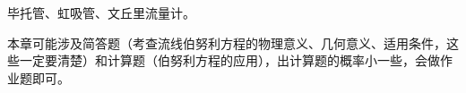 
毕托管、虹吸管、文丘里流量计。

\begin{tip}
	本章可能涉及简答题（考查流线伯努利方程的物理意义、几何意义、适用条件，这些一定要清楚）和计算题（伯努利方程的应用），出计算题的概率小一些，会做作业题即可。
\end{tip}
